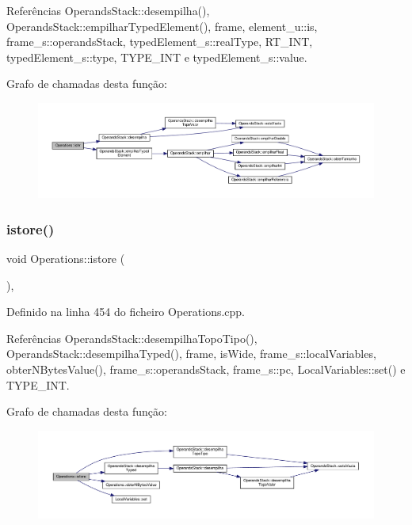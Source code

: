 Referências Operands\+Stack\+::desempilha(), Operands\+Stack\+::empilhar\+Typed\+Element(), frame, element\+\_\+u\+::is, frame\+\_\+s\+::operands\+Stack, typed\+Element\+\_\+s\+::real\+Type, R\+T\+\_\+\+I\+NT, typed\+Element\+\_\+s\+::type, T\+Y\+P\+E\+\_\+\+I\+NT e typed\+Element\+\_\+s\+::value.

Grafo de chamadas desta função\+:\nopagebreak
\begin{figure}[H]
\begin{center}
\leavevmode
\includegraphics[width=350pt]{classOperations_aa67d92582121939b307658d417b34d3c_cgraph}
\end{center}
\end{figure}
\mbox{\label{classOperations_a1547cbd0fa84e551f218d472a5187efa}} 
\subsubsection{\texorpdfstring{istore()}{istore()}}
{\footnotesize\ttfamily void Operations\+::istore (\begin{DoxyParamCaption}{ }\end{DoxyParamCaption})\hspace{0.3cm}{\ttfamily [static]}, {\ttfamily [private]}}



Definido na linha 454 do ficheiro Operations.\+cpp.



Referências Operands\+Stack\+::desempilha\+Topo\+Tipo(), Operands\+Stack\+::desempilha\+Typed(), frame, is\+Wide, frame\+\_\+s\+::local\+Variables, obter\+N\+Bytes\+Value(), frame\+\_\+s\+::operands\+Stack, frame\+\_\+s\+::pc, Local\+Variables\+::set() e T\+Y\+P\+E\+\_\+\+I\+NT.

Grafo de chamadas desta função\+:\nopagebreak
\begin{figure}[H]
\begin{center}
\leavevmode
\includegraphics[width=350pt]{classOperations_a1547cbd0fa84e551f218d472a5187efa_cgraph}
\end{center}
\end{figure}
\mbox{\label{classOperations_ae0a17c510b570467f5b025e3dcbe1398}} 
